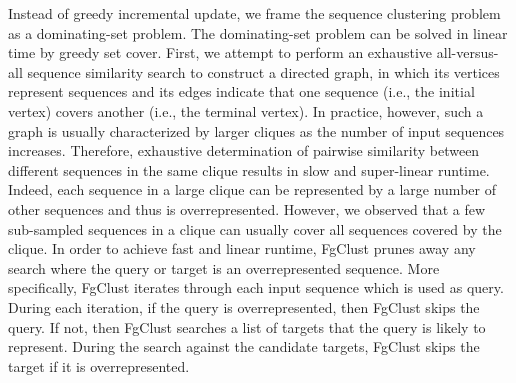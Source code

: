 \documentclass[11pt,letterpaper]{article}
\begin{document}

Instead of greedy incremental update, we frame the sequence clustering problem as a dominating-set problem.
The dominating-set problem can be solved in linear time by greedy set cover.
First, we attempt to perform an exhaustive all-versus-all sequence similarity search to construct a directed graph, in which its vertices represent sequences and its edges indicate that one sequence (i.e., the initial vertex) covers another (i.e., the terminal vertex).
In practice, however, such a graph is usually characterized by larger cliques as the number of input sequences increases.
Therefore, exhaustive determination of pairwise similarity between different sequences in the same clique results in slow and super-linear runtime.
Indeed, each sequence in a large clique can be represented by a large number of other sequences and thus is overrepresented.
However, we observed that a few sub-sampled sequences in a clique can usually cover all sequences covered by the clique.
In order to achieve fast and linear runtime, FgClust prunes away any search where the query or target is an overrepresented sequence.
More specifically, FgClust iterates through each input sequence which is used as query.
During each iteration, if the query is overrepresented, then FgClust skips the query.
If not, then FgClust searches a list of targets that the query is likely to represent.
During the search against the candidate targets, FgClust skips the target if it is overrepresented.
\end{document}
